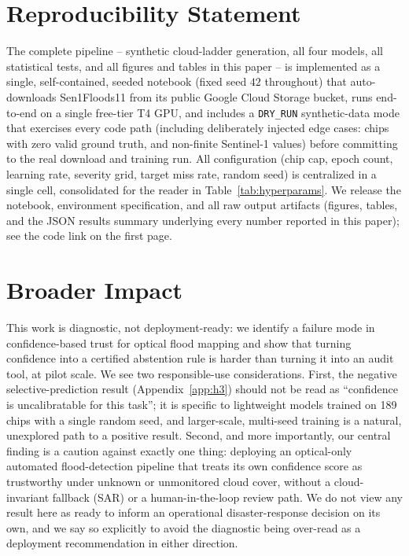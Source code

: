 \documentclass{article}
\begin{document}
\section{Reproducibility Statement}
\label{app:repro}

The complete pipeline -- synthetic cloud-ladder generation, all four models, all statistical tests, and all figures and tables in this paper -- is implemented as a single, self-contained, seeded notebook (fixed seed $42$ throughout) that auto-downloads Sen1Floods11 from its public Google Cloud Storage bucket, runs end-to-end on a single free-tier T4 GPU, and includes a \texttt{DRY\_RUN} synthetic-data mode that exercises every code path (including deliberately injected edge cases: chips with zero valid ground truth, and non-finite Sentinel-1 values) before committing to the real download and training run. All configuration (chip cap, epoch count, learning rate, severity grid, target miss rate, random seed) is centralized in a single cell, consolidated for the reader in Table~\ref{tab:hyperparams}. We release the notebook, environment specification, and all raw output artifacts (figures, tables, and the JSON results summary underlying every number reported in this paper); see the code link on the first page.

\section{Broader Impact}
\label{app:impact}

This work is diagnostic, not deployment-ready: we identify a failure mode in confidence-based trust for optical flood mapping and show that turning confidence into a certified abstention rule is harder than turning it into an audit tool, at pilot scale. We see two responsible-use considerations. First, the negative selective-prediction result (Appendix~\ref{app:h3}) should not be read as ``confidence is uncalibratable for this task''; it is specific to lightweight models trained on 189 chips with a single random seed, and larger-scale, multi-seed training is a natural, unexplored path to a positive result. Second, and more importantly, our central finding is a caution against exactly one thing: deploying an optical-only automated flood-detection pipeline that treats its own confidence score as trustworthy under unknown or unmonitored cloud cover, without a cloud-invariant fallback (SAR) or a human-in-the-loop review path. We do not view any result here as ready to inform an operational disaster-response decision on its own, and we say so explicitly to avoid the diagnostic being over-read as a deployment recommendation in either direction.
\end{document}
